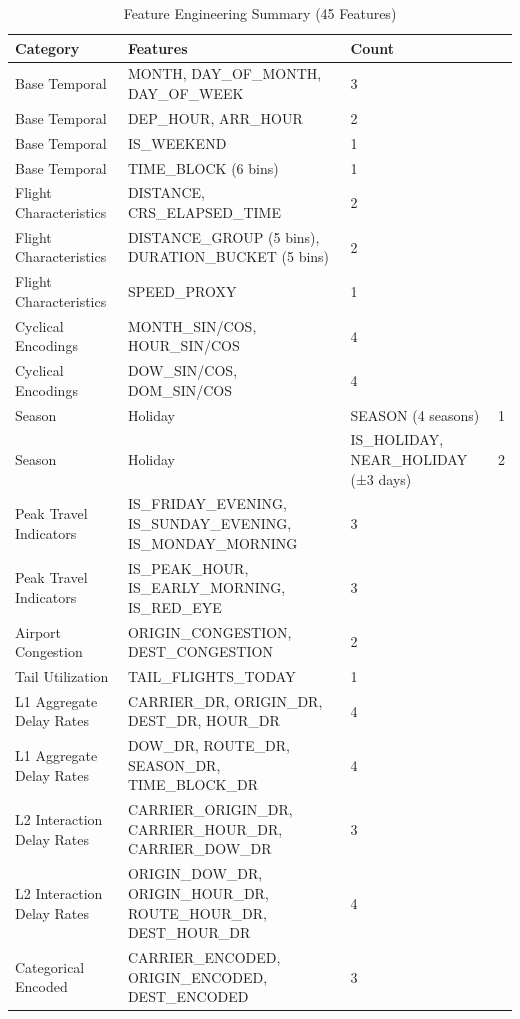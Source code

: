 \begin{table}[ht]
\centering
\caption{Feature Engineering Summary (45 Features)}
\label{tab:features}
\begin{tabular}{lll}
\hline
Category & Features & Count \\
\hline
Base Temporal & MONTH, DAY\_OF\_MONTH, DAY\_OF\_WEEK & 3 \\
Base Temporal & DEP\_HOUR, ARR\_HOUR & 2 \\
Base Temporal & IS\_WEEKEND & 1 \\
Base Temporal & TIME\_BLOCK (6 bins) & 1 \\
Flight Characteristics & DISTANCE, CRS\_ELAPSED\_TIME & 2 \\
Flight Characteristics & DISTANCE\_GROUP (5 bins), DURATION\_BUCKET (5 bins) & 2 \\
Flight Characteristics & SPEED\_PROXY & 1 \\
Cyclical Encodings & MONTH\_SIN/COS, HOUR\_SIN/COS & 4 \\
Cyclical Encodings & DOW\_SIN/COS, DOM\_SIN/COS & 4 \\
Season & Holiday & SEASON (4 seasons) & 1 \\
Season & Holiday & IS\_HOLIDAY, NEAR\_HOLIDAY (±3 days) & 2 \\
Peak Travel Indicators & IS\_FRIDAY\_EVENING, IS\_SUNDAY\_EVENING, IS\_MONDAY\_MORNING & 3 \\
Peak Travel Indicators & IS\_PEAK\_HOUR, IS\_EARLY\_MORNING, IS\_RED\_EYE & 3 \\
Airport Congestion & ORIGIN\_CONGESTION, DEST\_CONGESTION & 2 \\
Tail Utilization & TAIL\_FLIGHTS\_TODAY & 1 \\
L1 Aggregate Delay Rates & CARRIER\_DR, ORIGIN\_DR, DEST\_DR, HOUR\_DR & 4 \\
L1 Aggregate Delay Rates & DOW\_DR, ROUTE\_DR, SEASON\_DR, TIME\_BLOCK\_DR & 4 \\
L2 Interaction Delay Rates & CARRIER\_ORIGIN\_DR, CARRIER\_HOUR\_DR, CARRIER\_DOW\_DR & 3 \\
L2 Interaction Delay Rates & ORIGIN\_DOW\_DR, ORIGIN\_HOUR\_DR, ROUTE\_HOUR\_DR, DEST\_HOUR\_DR & 4 \\
Categorical Encoded & CARRIER\_ENCODED, ORIGIN\_ENCODED, DEST\_ENCODED & 3 \\
\hline
\end{tabular}
\end{table}